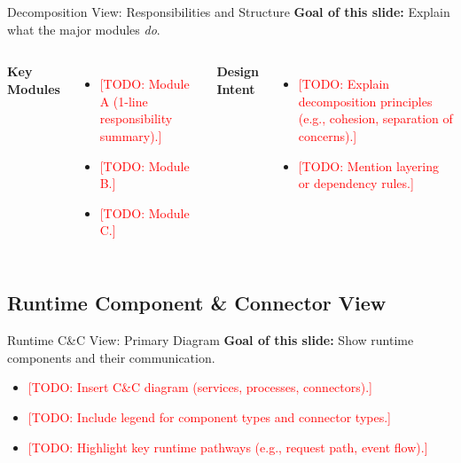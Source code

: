 \documentclass[aspectratio=169]{beamer}
\newcommand{\TODO}[1]{\textcolor{red}{[TODO: #1]}}
\begin{document}
\begin{frame}{Decomposition View: Responsibilities and Structure}
  \textbf{Goal of this slide:} Explain what the major modules \emph{do}.

  \begin{columns}[T]
      \textbf{Key Modules}
      \begin{itemize}
        \item \TODO{Module A (1-line responsibility summary).}
        \item \TODO{Module B.}
        \item \TODO{Module C.}
      \end{itemize}

      \textbf{Design Intent}
      \begin{itemize}
        \item \TODO{Explain decomposition principles (e.g., cohesion, separation of concerns).}
        \item \TODO{Mention layering or dependency rules.}
      \end{itemize}
  \end{columns}
\end{frame}

\subsection*{Runtime Component \& Connector View}

\begin{frame}{Runtime C\&C View: Primary Diagram}
  \textbf{Goal of this slide:} Show runtime components and their communication.

  \begin{itemize}
    \item \TODO{Insert C\&C diagram (services, processes, connectors).}
    \item \TODO{Include legend for component types and connector types.}
    \item \TODO{Highlight key runtime pathways (e.g., request path, event flow).}
  \end{itemize}
\end{frame}
\end{document}
